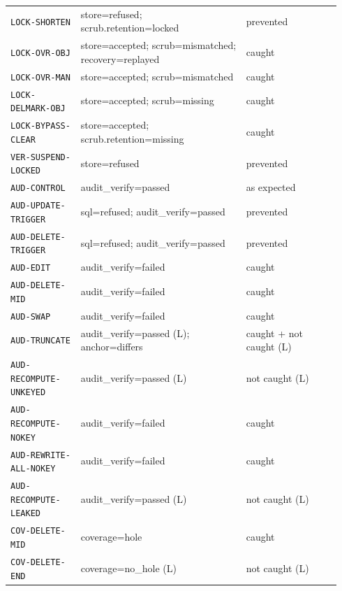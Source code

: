 \begin{tabular}{@{}p{0.2\linewidth}p{0.47\linewidth}p{0.27\linewidth}@{}}
\texttt{LOCK-SHORTEN} & store=refused; scrub.retention=locked & prevented \\
\texttt{LOCK-OVR-OBJ} & store=accepted; scrub=mismatched; recovery=replayed & caught \\
\texttt{LOCK-OVR-MAN} & store=accepted; scrub=mismatched & caught \\
\texttt{LOCK-DELMARK-OBJ} & store=accepted; scrub=missing & caught \\
\texttt{LOCK-BYPASS-CLEAR} & store=accepted; scrub.retention=missing & caught \\
\texttt{VER-SUSPEND-LOCKED} & store=refused & prevented \\
\texttt{AUD-CONTROL} & audit\_verify=passed & as expected \\
\texttt{AUD-UPDATE-TRIGGER} & sql=refused; audit\_verify=passed & prevented \\
\texttt{AUD-DELETE-TRIGGER} & sql=refused; audit\_verify=passed & prevented \\
\texttt{AUD-EDIT} & audit\_verify=failed & caught \\
\texttt{AUD-DELETE-MID} & audit\_verify=failed & caught \\
\texttt{AUD-SWAP} & audit\_verify=failed & caught \\
\texttt{AUD-TRUNCATE} & audit\_verify=passed (L); anchor=differs & caught + not caught (L) \\
\texttt{AUD-RECOMPUTE-UNKEYED} & audit\_verify=passed (L) & not caught (L) \\
\texttt{AUD-RECOMPUTE-NOKEY} & audit\_verify=failed & caught \\
\texttt{AUD-REWRITE-ALL-NOKEY} & audit\_verify=failed & caught \\
\texttt{AUD-RECOMPUTE-LEAKED} & audit\_verify=passed (L) & not caught (L) \\
\texttt{COV-DELETE-MID} & coverage=hole & caught \\
\texttt{COV-DELETE-END} & coverage=no\_hole (L) & not caught (L) \\
\bottomrule
\end{tabular}
